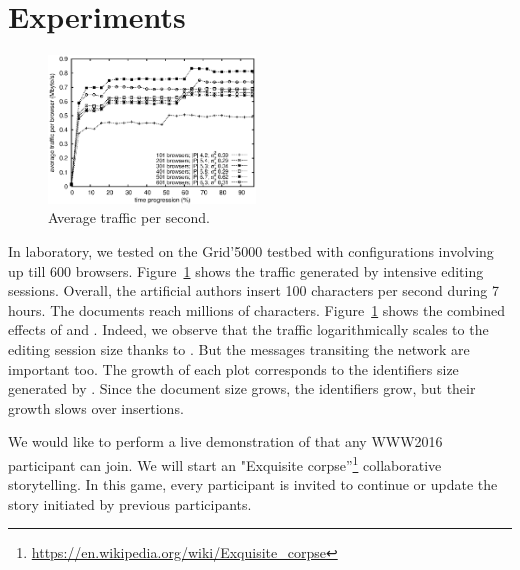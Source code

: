 
\section{Experiments}
\label{sec:live}

\begin{figure}
  \centering
  \includegraphics[width=0.49\textwidth]{img/traffic.eps}
  \caption{\label{fig:traffic}Average traffic per second.}
\end{figure}

In laboratory, we tested \CRATE on the Grid'5000 testbed with configurations
involving up till 600 browsers. Figure~\ref{fig:traffic} shows the traffic
generated by intensive editing sessions. Overall, the artificial authors insert
100 characters per second during 7 hours. The documents reach millions of
characters. Figure~\ref{fig:traffic} shows the combined effects of \SPRAY and
\LSEQ. Indeed, we observe that the traffic logarithmically scales to the editing
session size thanks to \SPRAY. But the messages transiting the network are
important too. The growth of each plot corresponds to the identifiers size
generated by \LSEQ. Since the document size grows, the identifiers grow, but
their growth slows over insertions. 



We would like to perform a live demonstration of \CRATE that any
WWW2016 participant can join. We will start an "Exquisite
corpse''\footnote{\url{https://en.wikipedia.org/wiki/Exquisite_corpse}}
collaborative storytelling. In this game, every participant is invited
to continue or update the story initiated by previous participants.

